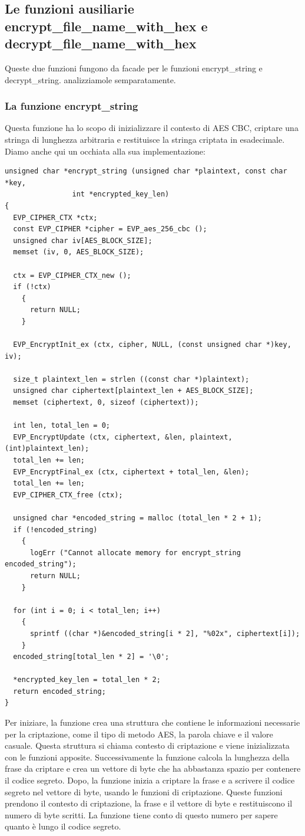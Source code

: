 \subsection{Le funzioni ausiliarie encrypt\_file\_name\_with\_hex e decrypt\_file\_name\_with\_hex}
Queste due funzioni fungono da facade per le funzioni encrypt\_string e decrypt\_string. analizziamole semparatamente.

\subsubsection{La funzione encrypt\_string}
Questa funzione ha lo scopo di inizializzare il contesto di AES CBC, criptare una stringa di lunghezza arbitraria e restituisce la stringa criptata in esadecimale. Diamo anche qui un occhiata alla sua implementazione:
\begin{lstlisting}[style=C, caption=Funzione encrypt\_string, label=C-key-utils.h]
unsigned char *encrypt_string (unsigned char *plaintext, const char *key,
                int *encrypted_key_len)
{
  EVP_CIPHER_CTX *ctx;
  const EVP_CIPHER *cipher = EVP_aes_256_cbc ();
  unsigned char iv[AES_BLOCK_SIZE];
  memset (iv, 0, AES_BLOCK_SIZE);

  ctx = EVP_CIPHER_CTX_new ();
  if (!ctx)
    {
      return NULL;
    }

  EVP_EncryptInit_ex (ctx, cipher, NULL, (const unsigned char *)key, iv);

  size_t plaintext_len = strlen ((const char *)plaintext);
  unsigned char ciphertext[plaintext_len + AES_BLOCK_SIZE];
  memset (ciphertext, 0, sizeof (ciphertext));

  int len, total_len = 0;
  EVP_EncryptUpdate (ctx, ciphertext, &len, plaintext, (int)plaintext_len);
  total_len += len;
  EVP_EncryptFinal_ex (ctx, ciphertext + total_len, &len);
  total_len += len;
  EVP_CIPHER_CTX_free (ctx);

  unsigned char *encoded_string = malloc (total_len * 2 + 1);
  if (!encoded_string)
    {
      logErr ("Cannot allocate memory for encrypt_string encoded_string");
      return NULL;
    }

  for (int i = 0; i < total_len; i++)
    {
      sprintf ((char *)&encoded_string[i * 2], "%02x", ciphertext[i]);
    }
  encoded_string[total_len * 2] = '\0';

  *encrypted_key_len = total_len * 2;
  return encoded_string;
}
\end{lstlisting}
Per iniziare, la funzione crea una struttura che contiene le informazioni necessarie per la criptazione, come il tipo di metodo AES, la parola chiave e il valore casuale. Questa struttura si chiama contesto di criptazione e viene inizializzata con le funzioni apposite. Successivamente la funzione calcola la lunghezza della frase da criptare e crea un vettore di byte che ha abbastanza spazio per contenere il codice segreto. Dopo, la funzione inizia a criptare la frase e a scrivere il codice segreto nel vettore di byte, usando le funzioni di criptazione. Queste funzioni prendono il contesto di criptazione, la frase e il vettore di byte e restituiscono il numero di byte scritti. La funzione tiene conto di questo numero per sapere quanto è lungo il codice segreto.
